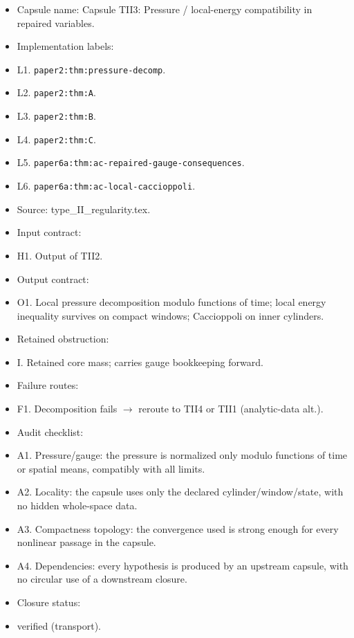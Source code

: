 \documentclass[11pt]{amsart}
\begin{document}
\begin{itemize}
  \item Capsule name: Capsule TII3: Pressure / local-energy compatibility in repaired variables.
  \item Implementation labels:
  \item L1. \texttt{paper2:thm:pressure-decomp}.
  \item L2. \texttt{paper2:thm:A}.
  \item L3. \texttt{paper2:thm:B}.
  \item L4. \texttt{paper2:thm:C}.
  \item L5. \texttt{paper6a:thm:ac-repaired-gauge-consequences}.
  \item L6. \texttt{paper6a:thm:ac-local-caccioppoli}.
  \item Source: type\_II\_regularity.tex.
  \item Input contract:
  \item H1. Output of TII2.
  \item Output contract:
  \item O1. Local pressure decomposition modulo functions of time; local energy inequality survives on compact windows; Caccioppoli on inner cylinders.
  \item Retained obstruction:
  \item I. Retained core mass; carries gauge bookkeeping forward.
  \item Failure routes:
  \item F1. Decomposition fails $\to$ reroute to TII4 or TII1 (analytic-data alt.).
  \item Audit checklist:
  \item A1. Pressure/gauge: the pressure is normalized only modulo functions of time or spatial means, compatibly with all limits.
  \item A2. Locality: the capsule uses only the declared cylinder/window/state, with no hidden whole-space data.
  \item A3. Compactness topology: the convergence used is strong enough for every nonlinear passage in the capsule.
  \item A4. Dependencies: every hypothesis is produced by an upstream capsule, with no circular use of a downstream closure.
  \item Closure status:
  \item verified (transport).
\end{itemize}
\end{document}

